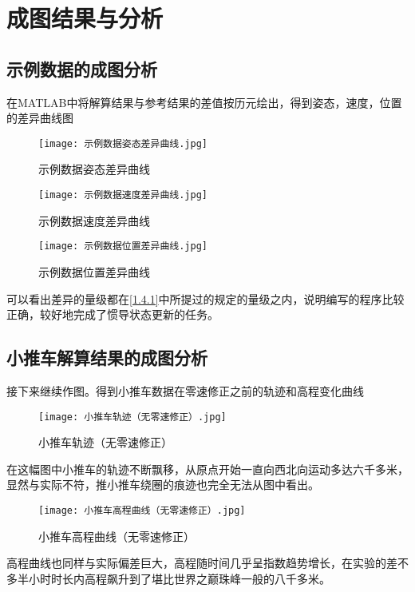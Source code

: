 \documentclass{ctexart}
\begin{document}
\section{成图结果与分析}
\subsection{示例数据的成图分析}
在MATLAB中将解算结果与参考结果的差值按历元绘出，得到姿态，速度，位置的差异曲线图
\begin{figure}[H]
\texttt{[image: 示例数据姿态差异曲线.jpg]}
\caption{示例数据姿态差异曲线}
\end{figure}
\begin{figure}[H]
\texttt{[image: 示例数据速度差异曲线.jpg]}
\caption{示例数据速度差异曲线}
\end{figure}
\begin{figure}[H]
\texttt{[image: 示例数据位置差异曲线.jpg]}
\caption{示例数据位置差异曲线}
\end{figure}

可以看出差异的量级都在\ref{1.4.1}中所提过的规定的量级之内，说明编写的程序比较正确，较好地完成了惯导状态更新的任务。
\subsection{小推车解算结果的成图分析}
接下来继续作图。得到小推车数据在零速修正之前的轨迹和高程变化曲线
\begin{figure}[H]
\texttt{[image: 小推车轨迹（无零速修正）.jpg]}
\caption{小推车轨迹（无零速修正）}
\end{figure}
在这幅图中小推车的轨迹不断飘移，从原点开始一直向西北向运动多达六千多米，显然与实际不符，推小推车绕圈的痕迹也完全无法从图中看出。
\begin{figure}[H]
\texttt{[image: 小推车高程曲线（无零速修正）.jpg]}
\caption{小推车高程曲线（无零速修正）}
\end{figure}
高程曲线也同样与实际偏差巨大，高程随时间几乎呈指数趋势增长，在实验的差不多半小时时长内高程飙升到了堪比世界之巅珠峰一般的八千多米。
\end{document}
